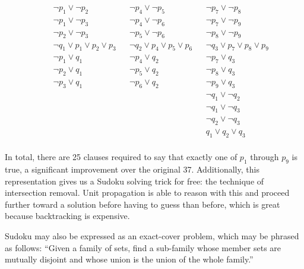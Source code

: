\documentclass{article}
\begin{document}
\begin{align*}
  && \lnot p_1 \lor \lnot p_2
  && \lnot p_4 \lor \lnot p_5
  && \lnot p_7 \lor \lnot p_8 \\
  && \lnot p_1 \lor \lnot p_3
  && \lnot p_4 \lor \lnot p_6
  && \lnot p_7 \lor \lnot p_9 \\
  && \lnot p_2 \lor \lnot p_3
  && \lnot p_5 \lor \lnot p_6
  && \lnot p_8 \lor \lnot p_9 \\
  && \lnot q_1 \lor p_1 \lor p_2 \lor p_3
  && \lnot q_2 \lor p_4 \lor p_5 \lor p_6
  && \lnot q_3 \lor p_7 \lor p_8 \lor p_9 \\
  && \lnot p_1 \lor q_1
  && \lnot p_4 \lor q_2
  && \lnot p_7 \lor q_3 \\
  && \lnot p_2 \lor q_1
  && \lnot p_5 \lor q_2
  && \lnot p_8 \lor q_3 \\
  && \lnot p_3 \lor q_1
  && \lnot p_6 \lor q_2
  && \lnot p_9 \lor q_3 \\
  && && && \lnot q_1 \lor \lnot q_2 \\
  && && && \lnot q_1 \lor \lnot q_3 \\
  && && && \lnot q_2 \lor \lnot q_3 \\
  && && && q_1 \lor q_2 \lor q_3 \\
\end{align*}


In total, there are 25 clauses required
to say that exactly one of $p_1$ through $p_9$ is true,
a significant improvement over the original 37.
Additionally, this representation gives us a Sudoku solving trick for free:
the technique of intersection removal.
Unit propagation is able to reason with this
and proceed further toward a solution
before having to guess than before,
which is great because backtracking is expensive.

Sudoku may also be expressed as an exact-cover problem,
which may be phrased as follows:
``Given a family of sets,
find a sub-family whose member sets are mutually disjoint
and whose union is the union of the whole family.''
\end{document}
